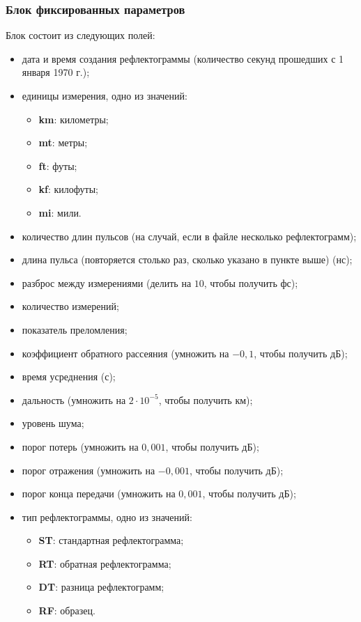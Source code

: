 \subsubsection{Блок фиксированных параметров}
\label{fixed_params_block}

Блок состоит из следующих полей:
\begin{itemize}
  \item дата и время создания рефлектограммы (количество секунд прошедших с 1 января 1970 г.);
  \item единицы измерения, одно из значений:
  \begin{itemize}
    \item \textbf{km}: километры;
    \item \textbf{mt}: метры;
    \item \textbf{ft}: футы;
    \item \textbf{kf}: килофуты;
    \item \textbf{mi}: мили.
  \end{itemize}
  \item количество длин пульсов (на случай, если в файле несколько рефлектограмм);
  \item длина пульса (повторяется столько раз, сколько указано в пункте выше) (нс);
  \item разброс между измерениями (делить на $10$, чтобы получить фс);
  \item количество измерений;
  \item показатель преломления;
  \item коэффициент обратного рассеяния (умножить на $-0,1$, чтобы получить дБ);
  \item время усреднения (с);
  \item дальность (умножить на $2\cdot 10^{-5}$, чтобы получить км);
  \item уровень шума;
  \item порог потерь (умножить на $0,001$, чтобы получить дБ);
  \item порог отражения (умножить на $-0,001$, чтобы получить дБ);
  \item порог конца передачи (умножить на $0,001$, чтобы получить дБ);
  \item тип рефлектограммы, одно из значений:
  \begin{itemize}
    \item \textbf{ST}: стандартная рефлектограмма;
    \item \textbf{RT}: обратная рефлектограмма;
    \item \textbf{DT}: разница рефлектограмм;
    \item \textbf{RF}: образец.
  \end{itemize}
\end{itemize}

